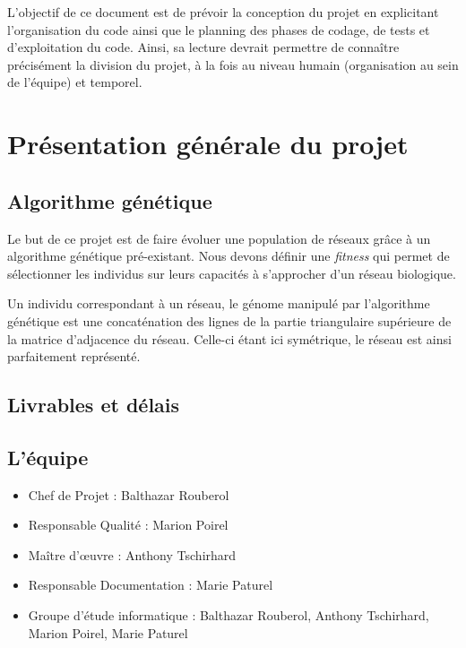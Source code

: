 


\maketitle

L'objectif de ce document est de prévoir la conception du projet en explicitant l'organisation du code ainsi que le planning des phases de codage, de tests et d'exploitation du code. Ainsi, sa lecture devrait permettre de connaître précisément la division du projet, à la fois au niveau humain (organisation au sein de l'équipe) et temporel.

\section{Présentation générale du projet}

\subsection{Algorithme génétique}
Le but de ce projet est de faire évoluer une population de réseaux grâce à un algorithme génétique pré-existant. Nous devons définir une \textit{fitness} qui permet de sélectionner les individus sur leurs capacités à s'approcher d'un réseau biologique.

Un individu correspondant à un réseau, le génome manipulé par l'algorithme génétique est une concaténation des lignes de la partie triangulaire supérieure de la matrice d'adjacence du réseau. Celle-ci étant ici symétrique, le réseau est ainsi parfaitement représenté.

\subsection{Livrables et délais}

\subsection{L'équipe}
\begin{itemize}
\item Chef de Projet : Balthazar Rouberol
\item Responsable Qualité : Marion Poirel
\item Ma\^itre d'œuvre : Anthony Tschirhard
\item Responsable Documentation : Marie Paturel
\item Groupe d'étude informatique : Balthazar Rouberol, Anthony Tschirhard, Marion Poirel, Marie Paturel
\end{itemize}




